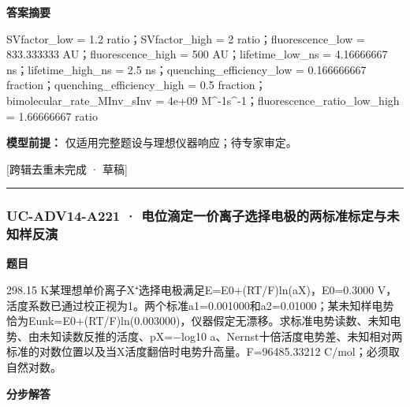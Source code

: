\documentclass[UTF8,11pt,a4paper]{ctexart}
\begin{document}
\noindent\textbf{答案摘要}\par
SVfactor\_low = 1.2 ratio；SVfactor\_high = 2 ratio；fluorescence\_low = 833.333333 AU；fluorescence\_high = 500 AU；lifetime\_low\_ns = 4.16666667 ns；lifetime\_high\_ns = 2.5 ns；quenching\_efficiency\_low = 0.166666667 fraction；quenching\_efficiency\_high = 0.5 fraction；bimolecular\_rate\_MInv\_sInv = 4e+09 M\textasciicircum{}-1s\textasciicircum{}-1；fluorescence\_ratio\_low\_high = 1.66666667 ratio\par
\noindent\textbf{模型前提：}
仅适用完整题设与理想仪器响应；待专家审定。\par
\noindent\textcolor{red!65!black}{[跨辑去重未完成 · 草稿]} \par
\medskip\hrule\medskip
{}
\subsubsection*{UC-ADV14-A221 · 电位滴定一价离子选择电极的两标准标定与未知样反演}
\noindent\textbf{题目}\par
298.15 K某理想单价离子X⁺选择电极满足E=E0+(RT/F)ln(aX)，E0=0.3000 V，活度系数已通过校正视为1。两个标准a1=0.001000和a2=0.01000；某未知样电势恰为Eunk=E0+(RT/F)ln(0.003000)，仪器假定无漂移。求标准电势读数、未知电势、由未知读数反推的活度、pX=−log10 a、Nernst十倍活度电势差、未知相对两标准的对数位置以及当X活度翻倍时电势升高量。F=96485.33212 C/mol；必须取自然对数。\par
\medskip\noindent\textbf{分步解答}
\end{document}
